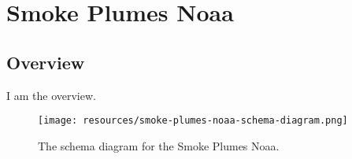 
\section{Smoke Plumes Noaa}
\label{sec:smoke-plumes-noaa}
\subsection{Overview}
\label{ssec:overview}

I am the overview.

\begin{figure}[h!]
  \begin{center}
    \texttt{[image: resources/smoke-plumes-noaa-schema-diagram.png]}
  \end{center}
  \caption{The schema diagram for the Smoke Plumes Noaa.}
  \label{fig:ov-diagram}
\end{figure}


